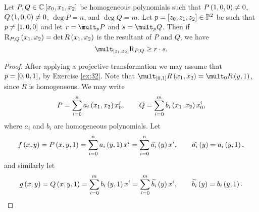\begin{lemma}
\label{lem:11.7}
Let $ P, Q \in \CC\sbr{x_0, x_1, x_2} $ be homogeneous polynomials such that $ P\br{1, 0, 0} \ne 0 $, $ Q\br{1, 0, 0} \ne 0 $, $ \deg P = n $, and $ \deg Q = m $. Let $ p = \sbr{z_0, z_1, z_2} \in \PP^2 $ be such that $ p \ne \sbr{1, 0, 0} $ and let $ r = \mult_p P $ and $ s = \mult_p Q $. Then if $ \R_{P, Q}\br{x_1, x_2} = \det R\br{x_1, x_2} $ is the resultant of $ P $ and $ Q $, we have
$$ \mult_{\sbr{z_1, z_2}} \R_{P, Q} \ge r \cdot s. $$
\end{lemma}

\begin{proof}
After applying a projective transformation we may assume that $ p = \sbr{0, 0, 1} $, by Exercise \ref{ex:32}. Note that $ \mult_{\sbr{0, 1}} R\br{x_1, x_2} = \mult_0 R\br{y, 1} $, since $ R $ is homogeneous. We may write
$$ P = \sum_{i = 0}^n a_i\br{x_1, x_2}x_0^i, \qquad Q = \sum_{i = 0}^m b_i\br{x_1, x_2}x_0^i, $$
where $ a_i $ and $ b_i $ are homogeneous polynomials. Let
$$ f\br{x, y} = P\br{x, y, 1} = \sum_{i = 0}^n a_i\br{y, 1}x^i = \sum_{i = 0}^n \widetilde{a_i}\br{y}x^i, \qquad \widetilde{a_i}\br{y} = a_i\br{y, 1}, $$
and similarly let
$$ g\br{x, y} = Q\br{x, y, 1} = \sum_{i = 0}^m b_i\br{y, 1}x^i = \sum_{i = 0}^m \widetilde{b_i}\br{y}x^i, \qquad \widetilde{b_i}\br{y} = b_i\br{y, 1}. $$

\pagebreak


\end{proof}
